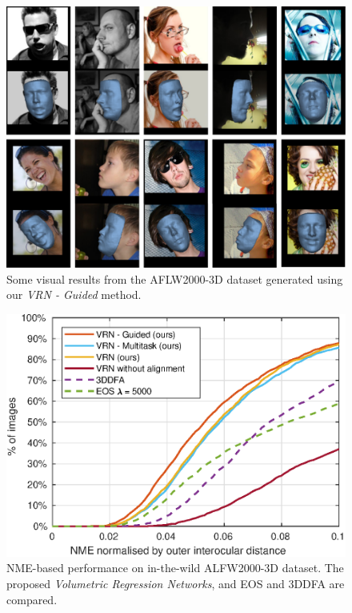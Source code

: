\begin{figure}
  \centering
  \includegraphics[width=0.7\linewidth]{img/aflw2000res.pdf}
  \caption[Visual results on AFLW2000-3D dataset]{Some visual results
    from the AFLW2000-3D dataset generated using our \textit{VRN -
      Guided} method.}
  \label{fig:aflw2000res}
  \vspace{-4mm}
\end{figure}

\begin{figure}
  \centering
  \includegraphics[width=0.75\linewidth]{curves/aflw.eps}
  \caption[NME performance on AFLW2000-3D images]{NME-based
    performance on in-the-wild ALFW2000-3D dataset. The proposed
    \textit{Volumetric Regression Networks}, and EOS and 3DDFA are
    compared.}
  \label{roc:aflw2000}
\end{figure}

